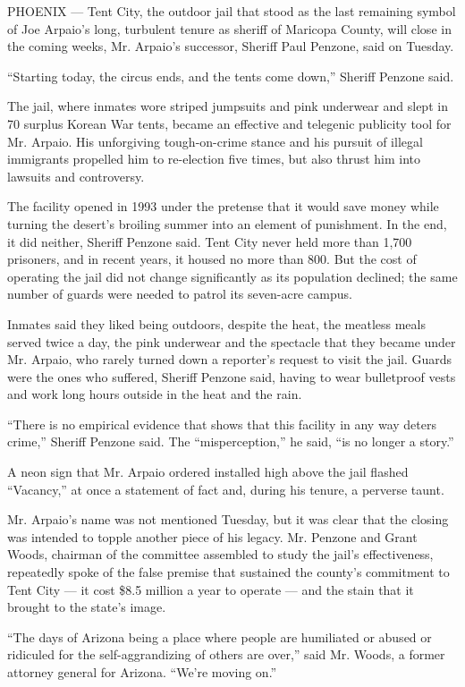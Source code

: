 PHOENIX --- Tent City, the outdoor jail that stood as the last remaining
symbol of Joe Arpaio's long, turbulent tenure as sheriff of Maricopa
County, will close in the coming weeks, Mr. Arpaio's successor, Sheriff
Paul Penzone, said on Tuesday.

``Starting today, the circus ends, and the tents come down,'' Sheriff
Penzone said.

The jail, where inmates wore striped jumpsuits and pink underwear and
slept in 70 surplus Korean War tents, became an effective and telegenic
publicity tool for Mr. Arpaio. His unforgiving tough-on-crime stance and
his pursuit of illegal immigrants propelled him to re-election five
times, but also thrust him into lawsuits and controversy.

The facility opened in 1993 under the pretense that it would save money
while turning the desert's broiling summer into an element of
punishment. In the end, it did neither, Sheriff Penzone said. Tent City
never held more than 1,700 prisoners, and in recent years, it housed no
more than 800. But the cost of operating the jail did not change
significantly as its population declined; the same number of guards were
needed to patrol its seven-acre campus.

Inmates said they liked being outdoors, despite the heat, the meatless
meals served twice a day, the pink underwear and the spectacle that they
became under Mr. Arpaio, who rarely turned down a reporter's request to
visit the jail. Guards were the ones who suffered, Sheriff Penzone said,
having to wear bulletproof vests and work long hours outside in the heat
and the rain.

``There is no empirical evidence that shows that this facility in any
way deters crime,'' Sheriff Penzone said. The ``misperception,'' he
said, ``is no longer a story.''

A neon sign that Mr. Arpaio ordered installed high above the jail
flashed ``Vacancy,'' at once a statement of fact and, during his tenure,
a perverse taunt.

Mr. Arpaio's name was not mentioned Tuesday, but it was clear that the
closing was intended to topple another piece of his legacy. Mr. Penzone
and Grant Woods, chairman of the committee assembled to study the jail's
effectiveness, repeatedly spoke of the false premise that sustained the
county's commitment to Tent City --- it cost \$8.5 million a year to
operate --- and the stain that it brought to the state's image.

``The days of Arizona being a place where people are humiliated or
abused or ridiculed for the self-aggrandizing of others are over,'' said
Mr. Woods, a former attorney general for Arizona. ``We're moving on.''

